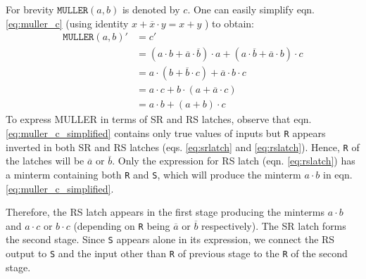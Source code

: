 For brevity $\texttt{MULLER}(a,b)$ is denoted by $c$. 
 One can easily simplify eqn. \ref{eq:muller_c} (using identity $x + \overline{x}
 \cdot y = x + y$ ) to obtain:
\begin{equation}\label{eq:muller_c_simplified}
\begin{split}
	\texttt{MULLER}(a,b)' &= c'\\
	&= (a \cdot b + \overline{a} \cdot \overline{b}) \cdot a 
		+ (a \cdot \overline{b} + \overline{a} \cdot b) \cdot c \\
	&= a \cdot (b + \overline{b} \cdot c) + \overline{a} \cdot b \cdot c \\
	&= a \cdot c + b \cdot (a + \overline{a} \cdot c) \\
	&= a \cdot b + (a + b) \cdot c
\end{split}
\end{equation}
To express MULLER in terms of SR and RS latches, 
observe that eqn. \ref{eq:muller_c_simplified} contains only true values of
inputs but \texttt{R} appears inverted in both SR and RS latches (eqs. \ref{eq:srlatch}
and \ref{eq:rslatch}). 
Hence, \texttt{R} of the latches will be $\overline{a}$ or $\overline{b}$.
Only the expression for RS latch (eqn. \ref{eq:rslatch}) has a minterm containing both \texttt{R}
and \texttt{S}, which will produce the minterm $ a \cdot b $ in eqn. \ref{eq:muller_c_simplified}.

Therefore, the RS latch appears in the first stage producing the minterms $a
\cdot b$ and $a \cdot c$ or $b \cdot c$ (depending on \texttt{R} being
$\overline{a}$ or $\overline{b}$ respectively). 
The SR latch forms the second stage.
Since \texttt{S} appears alone in its expression, we connect the RS output
to \texttt{S} and the input other than \texttt{R} of previous stage to the
\texttt{R} of the second stage.


